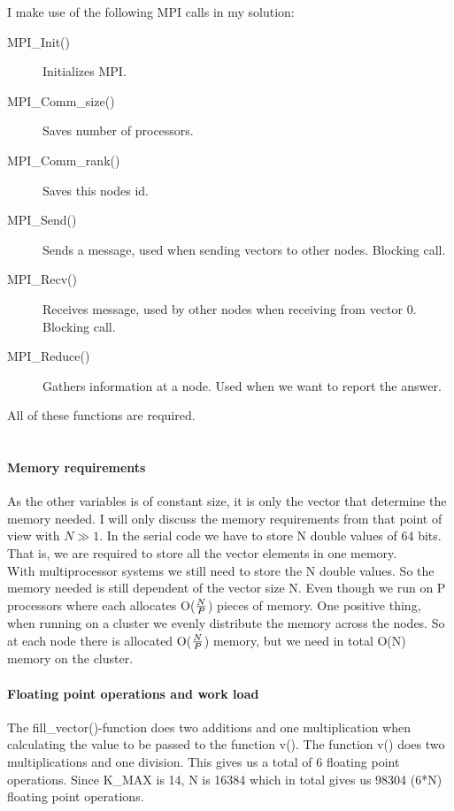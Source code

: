 \documentclass{article}
\begin{document}
I make use of the following MPI calls in my solution:

\begin{description} 
	\item[MPI\_Init()] Initializes MPI.
	\item[MPI\_Comm\_size()] Saves number of processors.
	\item[MPI\_Comm\_rank()] Saves this nodes id.
	\item[MPI\_Send()] Sends a message, used when sending vectors to other nodes. Blocking call.
	\item[MPI\_Recv()] Receives message, used by other nodes when receiving from vector 0. Blocking call.
	\item[MPI\_Reduce()] Gathers information at a node. Used when we want to report the answer.
\end{description}

All of these functions are required. \\ \\

\paragraph*{Memory requirements} 
As the other variables is of constant size, it is only the vector that determine the memory needed. I will only discuss the memory requirements from that point of view with $N\gg1$. In the serial code we have to store N double values of 64 bits. That is, we are required to store all the vector elements in one memory.\\

With multiprocessor systems we still need to store the N double values. So the memory needed is still dependent of the vector size N. Even though we run on P processors where each allocates O($N \over P$) pieces of memory. One positive thing, when running on a cluster we evenly distribute the memory across the nodes. So at each node there is allocated O($N \over P$) memory, but we need in total O(N) memory on the cluster. \\

\paragraph*{Floating point operations and work load} 
The fill\_vector()-function does two additions and one multiplication when calculating the value to be passed to the function v(). The function v() does two multiplications and one division. This gives us a total of 6 floating point operations. Since K\_MAX is 14, N is 16384 which in total gives us 98304 (6*N) floating point operations.  \\ 
\end{document}
